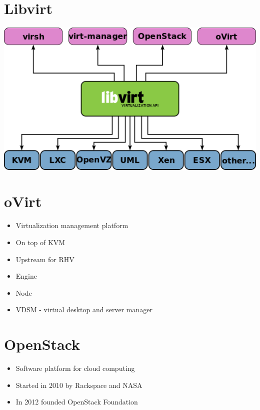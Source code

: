 \documentclass[11pt]{article}
\begin{document}
\section*{Libvirt}
\label{sec:orge686a84}
\begin{center}
\includegraphics[width=.9\linewidth]{./libvirt.png}
\end{center}

\section*{oVirt}
\label{sec:org9e02eca}
\begin{itemize}
\item Virtualization management platform
\item On top of KVM
\item Upstream for RHV
\item Engine
\item Node
\item VDSM - virtual desktop and server manager
\end{itemize}

\section*{OpenStack}
\label{sec:org4808092}
\begin{itemize}
\item Software platform for cloud computing
\item Started in 2010 by Rackspace and NASA
\item In 2012 founded OpenStack Foundation
\end{itemize}
\end{document}
